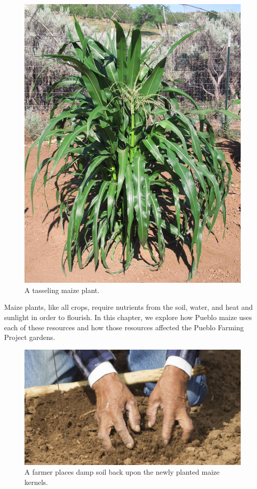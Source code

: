 \documentclass[12pt,]{article}
\begin{document}
\begin{figure}
\centering
\includegraphics{./images/chapter_4_header.jpg}
\caption{A tasseling maize plant.}
\end{figure}

Maize plants, like all crops, require nutrients from the soil, water, and heat and sunlight in order to flourish. In this chapter, we explore how Pueblo maize uses each of these resources and how those resources affected the Pueblo Farming Project gardens.

\begin{figure}
\centering
\includegraphics{./images/section_4.1_header.jpg}
\caption{A farmer places damp soil back upon the newly planted maize kernels.}
\end{figure}
\end{document}
